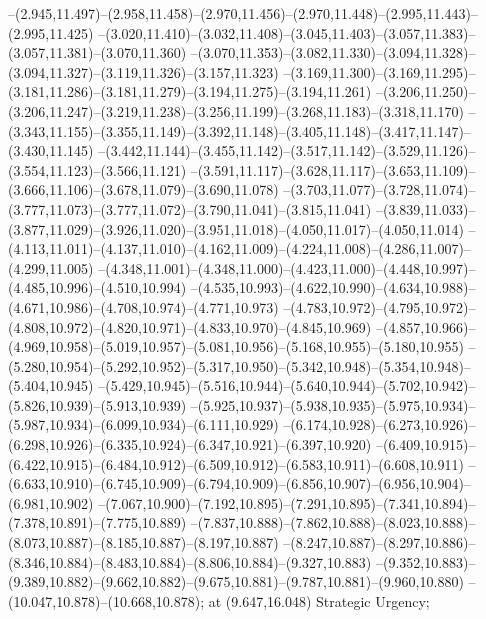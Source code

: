   --(2.945,11.497)--(2.958,11.458)--(2.970,11.456)--(2.970,11.448)--(2.995,11.443)--(2.995,11.425)%
  --(3.020,11.410)--(3.032,11.408)--(3.045,11.403)--(3.057,11.383)--(3.057,11.381)--(3.070,11.360)%
  --(3.070,11.353)--(3.082,11.330)--(3.094,11.328)--(3.094,11.327)--(3.119,11.326)--(3.157,11.323)%
  --(3.169,11.300)--(3.169,11.295)--(3.181,11.286)--(3.181,11.279)--(3.194,11.275)--(3.194,11.261)%
  --(3.206,11.250)--(3.206,11.247)--(3.219,11.238)--(3.256,11.199)--(3.268,11.183)--(3.318,11.170)%
  --(3.343,11.155)--(3.355,11.149)--(3.392,11.148)--(3.405,11.148)--(3.417,11.147)--(3.430,11.145)%
  --(3.442,11.144)--(3.455,11.142)--(3.517,11.142)--(3.529,11.126)--(3.554,11.123)--(3.566,11.121)%
  --(3.591,11.117)--(3.628,11.117)--(3.653,11.109)--(3.666,11.106)--(3.678,11.079)--(3.690,11.078)%
  --(3.703,11.077)--(3.728,11.074)--(3.777,11.073)--(3.777,11.072)--(3.790,11.041)--(3.815,11.041)%
  --(3.839,11.033)--(3.877,11.029)--(3.926,11.020)--(3.951,11.018)--(4.050,11.017)--(4.050,11.014)%
  --(4.113,11.011)--(4.137,11.010)--(4.162,11.009)--(4.224,11.008)--(4.286,11.007)--(4.299,11.005)%
  --(4.348,11.001)--(4.348,11.000)--(4.423,11.000)--(4.448,10.997)--(4.485,10.996)--(4.510,10.994)%
  --(4.535,10.993)--(4.622,10.990)--(4.634,10.988)--(4.671,10.986)--(4.708,10.974)--(4.771,10.973)%
  --(4.783,10.972)--(4.795,10.972)--(4.808,10.972)--(4.820,10.971)--(4.833,10.970)--(4.845,10.969)%
  --(4.857,10.966)--(4.969,10.958)--(5.019,10.957)--(5.081,10.956)--(5.168,10.955)--(5.180,10.955)%
  --(5.280,10.954)--(5.292,10.952)--(5.317,10.950)--(5.342,10.948)--(5.354,10.948)--(5.404,10.945)%
  --(5.429,10.945)--(5.516,10.944)--(5.640,10.944)--(5.702,10.942)--(5.826,10.939)--(5.913,10.939)%
  --(5.925,10.937)--(5.938,10.935)--(5.975,10.934)--(5.987,10.934)--(6.099,10.934)--(6.111,10.929)%
  --(6.174,10.928)--(6.273,10.926)--(6.298,10.926)--(6.335,10.924)--(6.347,10.921)--(6.397,10.920)%
  --(6.409,10.915)--(6.422,10.915)--(6.484,10.912)--(6.509,10.912)--(6.583,10.911)--(6.608,10.911)%
  --(6.633,10.910)--(6.745,10.909)--(6.794,10.909)--(6.856,10.907)--(6.956,10.904)--(6.981,10.902)%
  --(7.067,10.900)--(7.192,10.895)--(7.291,10.895)--(7.341,10.894)--(7.378,10.891)--(7.775,10.889)%
  --(7.837,10.888)--(7.862,10.888)--(8.023,10.888)--(8.073,10.887)--(8.185,10.887)--(8.197,10.887)%
  --(8.247,10.887)--(8.297,10.886)--(8.346,10.884)--(8.483,10.884)--(8.806,10.884)--(9.327,10.883)%
  --(9.352,10.883)--(9.389,10.882)--(9.662,10.882)--(9.675,10.881)--(9.787,10.881)--(9.960,10.880)%
  --(10.047,10.878)--(10.668,10.878);
 at (9.647,16.048) {Strategic Urgency};
